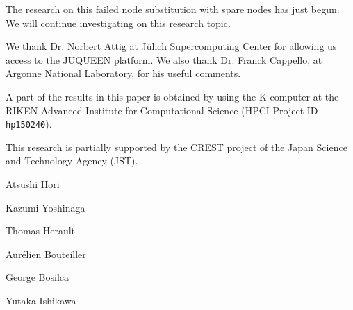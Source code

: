 \documentclass[Afour,times,sageh]{sagej}
\begin{document}
The research on this failed node substitution with spare nodes has
just begun. We will continue investigating on this research topic.

\begin{acks}
We thank Dr. Norbert Attig at J\"{u}lich Supercomputing Center for
allowing us access to the JUQUEEN platform. We also thank Dr. Franck
Cappello, at Argonne National Laboratory, for his useful
comments.

A part of the results in this paper is obtained by using the K
computer at the RIKEN Advanced Institute for Computational
Science (HPCI Project ID {\tt hp150240}).
\end{acks}

\begin{funding}
This research is partially supported by the CREST project of
the Japan Science and Technology Agency (JST).
\end{funding}



\begin{biog}
Atsushi Hori

Kazumi Yoshinaga

Thomas Herault

Aur\'elien Bouteiller

George Bosilca

Yutaka Ishikawa

\end{biog}
\end{document}
